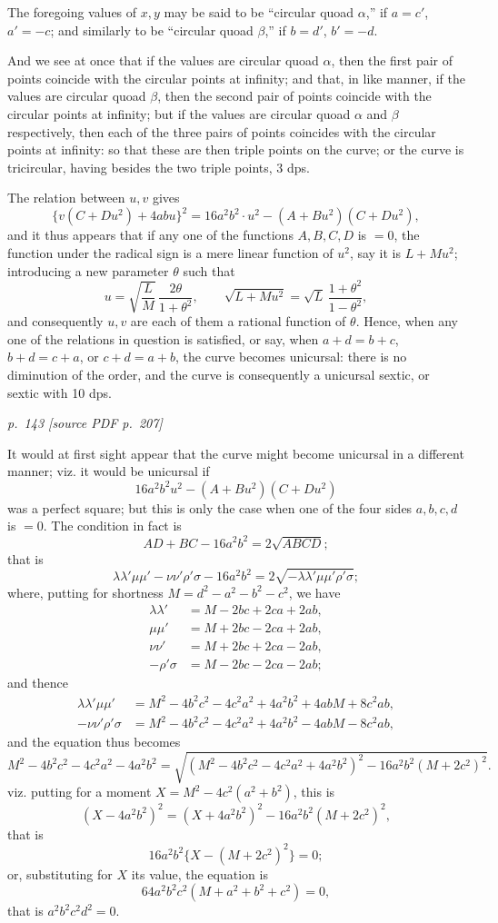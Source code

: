 \documentclass[11pt,a4paper]{article}
\newcommand{\sourcepage}[2]{%
  \bigskip
  \noindent\textit{p.~#1 [source PDF p.~#2]}%
  \par\smallskip
}
\begin{document}
The foregoing values of \(x,y\) may be said to be ``circular quoad \(\alpha\),'' if
\(a=c'\), \(a'=-c\); and similarly to be ``circular quoad \(\beta\),'' if
\(b=d'\), \(b'=-d\).

And we see at once that if the values are circular quoad \(\alpha\), then the first
pair of points coincide with the circular points at infinity; and that, in like manner,
if the values are circular quoad \(\beta\), then the second pair of points coincide
with the circular points at infinity; but if the values are circular quoad \(\alpha\)
and \(\beta\) respectively, then each of the three pairs of points coincides with the
circular points at infinity: so that these are then triple points on the curve; or the
curve is tricircular, having besides the two triple points, 3 dps.

The relation between \(u,v\) gives
\[
\{v(C+Du^2)+4abu\}^2=16a^2b^2\cdot u^2-(A+Bu^2)(C+Du^2),
\]
and it thus appears that if any one of the functions \(A,B,C,D\) is \(=0\), the
function under the radical sign is a mere linear function of \(u^2\), say it is
\(L+Mu^2\); introducing a new parameter \(\theta\) such that
\[
u=\sqrt{\frac{L}{M}}\,\frac{2\theta}{1+\theta^2},
\qquad
\sqrt{L+Mu^2}=\sqrt{L}\,\frac{1+\theta^2}{1-\theta^2},
\]
and consequently \(u,v\) are each of them a rational function of \(\theta\). Hence,
when any one of the relations in question is satisfied, or say, when
\(a+d=b+c\), \(b+d=c+a\), or \(c+d=a+b\), the curve becomes unicursal: there is
no diminution of the order, and the curve is consequently a unicursal sextic, or
sextic with 10 dps.

\sourcepage{143}{207}

It would at first sight appear that the curve might become unicursal in a different
manner; viz. it would be unicursal if
\[
16a^2b^2u^2-(A+Bu^2)(C+Du^2)
\]
was a perfect square; but this is only the case when one of the four sides
\(a,b,c,d\) is \(=0\). The condition in fact is
\[
AD+BC-16a^2b^2=2\sqrt{ABCD};
\]
that is
\[
\lambda\lambda'\mu\mu'-\nu\nu'\rho'\sigma-16a^2b^2
  =2\sqrt{-\lambda\lambda'\mu\mu'\rho'\sigma};
\]
where, putting for shortness \(M=d^2-a^2-b^2-c^2\), we have
\[
\begin{aligned}
\lambda\lambda'&=M-2bc+2ca+2ab,\\
\mu\mu'&=M+2bc-2ca+2ab,\\
\nu\nu'&=M+2bc+2ca-2ab,\\
-\rho'\sigma&=M-2bc-2ca-2ab;
\end{aligned}
\]
and thence
\[
\begin{aligned}
\lambda\lambda'\mu\mu'
  &=M^2-4b^2c^2-4c^2a^2+4a^2b^2+4abM+8c^2ab,\\
-\nu\nu'\rho'\sigma
  &=M^2-4b^2c^2-4c^2a^2+4a^2b^2-4abM-8c^2ab,
\end{aligned}
\]
and the equation thus becomes
\[
M^2-4b^2c^2-4c^2a^2-4a^2b^2
=\sqrt{(M^2-4b^2c^2-4c^2a^2+4a^2b^2)^2-16a^2b^2(M+2c^2)^2}.
\]
viz. putting for a moment \(X=M^2-4c^2(a^2+b^2)\), this is
\[
(X-4a^2b^2)^2=(X+4a^2b^2)^2-16a^2b^2(M+2c^2)^2,
\]
that is
\[
16a^2b^2\{X-(M+2c^2)^2\}=0;
\]
or, substituting for \(X\) its value, the equation is
\[
64a^2b^2c^2(M+a^2+b^2+c^2)=0,
\]
that is \(a^2b^2c^2d^2=0\).
\end{document}
